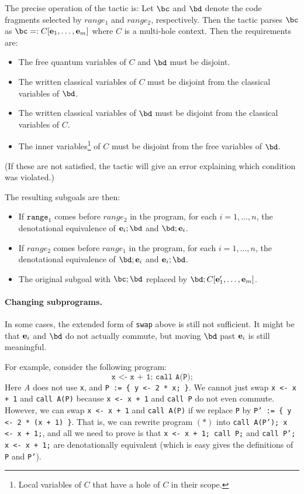 \documentclass{article}
\begin{document}
The precise operation of the tactic is:
Let $\bc$ and $\bd$ denote the code fragments selected by $\mathit{range_1}$ and $\mathit{range_2}$, respectively.
Then the tactic parses $\bc$ as $\bc=:C[\be_1,\dots,\be_m]$ where $C$ is a multi-hole context. Then the requirements are:
\begin{itemize}
\item The free quantum variables of $C$ and $\bd$ must be disjoint.
\item The written classical variables of $C$ must be disjoint from the classical variables of $\bd$.
\item The written classical variables of $\bd$ must be disjoint from the classical variables of $C$.
\item The inner variables\footnote{Local variables of $C$ that have a hole of $C$ in their scope.} of $C$ must be disjoint from the free variables of $\bd$.
\end{itemize}
(If these are not satisfied, the tactic will give an error explaining which condition was violated.)

The resulting subgoals are then:
\begin{itemize}
\item If $\mathtt{range_1}$ comes before $\mathit{range_2}$ in the program, for each $i=1,\dots,n$, the denotational equivalence of  ${\be_i;\bd}$ and $\bd;\be_i$.
\item If $\mathit{range_2}$ comes before $\mathit{range_1}$ in the program, for each $i=1,\dots,n$, the denotational equivalence of   $\bd;\be_i$ and ${\be_i;\bd}$.
\item The original subgoal with $\bc;\bd$ replaced by $\bd;C[\be_1',\dots,\be_m]$.
\end{itemize}

\paragraph{Changing subprograms.}
In some cases, the extended form of \texttt{swap} above is still not sufficient.
It might be that $\mathbf e_i$ and $\bd$ do not actually commute, but moving $\bd$ past $\mathbf e_i$ is still meaningful.

For example, consider the following program:
\begin{equation*}
  \texttt{x <- x + 1; call A(P);}
  \tag{*}
\end{equation*}
Here \emph{A} does not use \texttt{x}, and \texttt{P := \{ y <- 2 * x; \}}.
We cannot just swap \texttt{x <- x + 1} and \texttt{call A(P)} because \texttt{x <- x + 1} and \texttt{call P} do not even commute.
However, we can swap \texttt{x <- x + 1} and \texttt{call A(P)} if we replace \texttt{P} by \texttt{P' := \{ y <- 2 * (x + 1) \}}.
That is, we can rewrite program $(*)$ into \texttt{call A(P'); x <- x + 1;}, and all we need to prove is that \texttt{x <- x + 1; call P;} and \texttt{call P'; x <- x + 1;} are denotationally equivalent (which is easy gives the definitions of \texttt{P} and \texttt{P'}).
\end{document}
